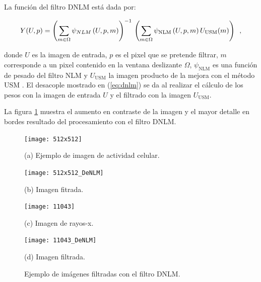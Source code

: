 La función del filtro DNLM est\'a dada por:

\begin{equation}
\label{eq:dnlm}
Y(U,p)=\left(\sum_{m\in \Omega}\psi_{NLM}\left(U, p, m\right)\right)^{-1} \\ \left(\sum_{m\in \Omega}\psi_{\textrm{NLM}}\left(U, p, m\right)U_{\textrm{USM}}(m)\right) \enspace ,
\end{equation}

donde $U$ es la imagen de entrada, $p$ es el pixel que se pretende filtrar, $m$ corresponde a un pixel contenido en la ventana deslizante $\Omega$, $\psi_{\textrm{NLM}}$ es una función de pesado del filtro NLM y $U_{\textrm{USM}}$ la imagen producto de la mejora con el método USM \cite{calderon2015dewaff}. El desacople mostrado en (\ref{eq:dnlm}) se da al realizar el c\'alculo de los pesos con la imagen de entrada $U$ y el filtrado con la imagen $U_{\textrm{USM}}$.

La figura \ref{fig:exampleDNLM} muestra el aumento en contraste de la imagen y el mayor detalle en bordes resultado del procesamiento con el filtro DNLM.

\begin{figure}[H]
\centering
\begin{minipage}[b]{0.3\textwidth}
  \centering
  \centerline{\texttt{[image: 512x512]}}
  \centerline{(a) Ejemplo de imagen de actividad celular.}\medskip
\end{minipage}
\hfill
\begin{minipage}[b]{0.3\textwidth}
  \centering
  \centerline{\texttt{[image: 512x512\_DeNLM]}}
  \centerline{(b) Imagen fitrada.}
\end{minipage}
\vfill
\begin{minipage}[b]{0.3\textwidth}
  \centering
  \centerline{\texttt{[image: 11043]}}
  \centerline{(c) Imagen de rayos-x.}\medskip
\end{minipage}
\hfill
\begin{minipage}[b]{0.3\textwidth}
  \centering
  \centerline{\texttt{[image: 11043\_DeNLM]}}
  \centerline{(d) Imagen filtrada.}\medskip
\end{minipage}
%
\caption[Ejemplo de im\'agenes filtradas con el filtro DNLM]{Ejemplo de im\'agenes filtradas con el filtro DNLM. \label{fig:exampleDNLM}}

%
\end{figure}



